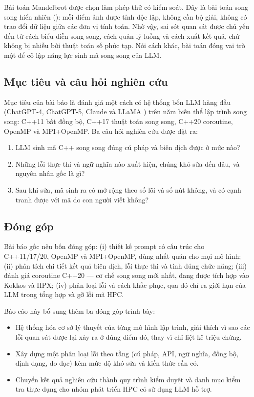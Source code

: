 Bài toán Mandelbrot được chọn làm phép thử có kiểm soát. Đây là bài toán song
song hiển nhiên (): mỗi điểm ảnh được tính độc lập,
không cần bộ giải, không có trao đổi dữ liệu giữa các đơn vị tính toán. Nhờ vậy,
sai sót quan sát được chủ yếu đến từ cách biểu diễn song song, cách quản lý luồng
và cách xuất kết quả, chứ không bị nhiễu bởi thuật toán số phức tạp. Nói cách
khác, bài toán đóng vai trò một  để cô lập năng lực sinh
mã song song của LLM.

\subsection{Mục tiêu và câu hỏi nghiên cứu}

Mục tiêu của bài báo là đánh giá một cách có hệ thống bốn LLM hàng đầu
(ChatGPT-4, ChatGPT-5, Claude và LLaMA \cite{achiam2023gpt4,touvron2023llama}) trên năm biến thể lập trình song song:
C++11 bất đồng bộ, C++17 thuật toán song song, C++20 coroutine, OpenMP và
MPI+OpenMP. Ba câu hỏi nghiên cứu được đặt ra:

\begin{enumerate}[label=\textbf{RQ\arabic*.},leftmargin=2.2cm]
  \item LLM sinh mã C++ song song đúng cú pháp và biên dịch được ở mức nào?
  \item Những lỗi thực thi và ngữ nghĩa nào xuất hiện, chúng khó sửa đến đâu, và
        nguyên nhân gốc là gì?
  \item Sau khi sửa, mã sinh ra có mở rộng theo số lõi và số nút không, và có
        cạnh tranh được với mã do con người viết không?
\end{enumerate}

\subsection{Đóng góp}

Bài báo gốc nêu bốn đóng góp: (i) thiết kế prompt có cấu trúc cho C++11/17/20,
OpenMP và MPI+OpenMP, dùng nhất quán cho mọi mô hình; (ii) phân tích chi tiết kết
quả biên dịch, lỗi thực thi và tính đúng chức năng; (iii) đánh giá coroutine
C++20 — cơ chế song song mới nhất, đang được tích hợp vào Kokkos và HPX; (iv)
phân loại lỗi và cách khắc phục, qua đó chỉ ra giới hạn của LLM trong tổng hợp và
gỡ lỗi mã HPC.

Báo cáo này bổ sung thêm ba đóng góp trình bày:

\begin{itemize}
  \item Hệ thống hóa cơ sở lý thuyết của từng mô hình lập trình, giải thích vì sao
        các lỗi quan sát được lại xảy ra ở đúng điểm đó, thay vì chỉ liệt kê triệu
        chứng.
  \item Xây dựng một phân loại lỗi theo tầng (cú pháp, API, ngữ nghĩa, đồng bộ,
        định dạng, đo đạc) kèm mức độ khó sửa và kiến thức cần có.
  \item Chuyển kết quả nghiên cứu thành quy trình kiểm duyệt và danh mục kiểm tra
        thực dụng cho nhóm phát triển HPC có sử dụng LLM hỗ trợ.
\end{itemize}

